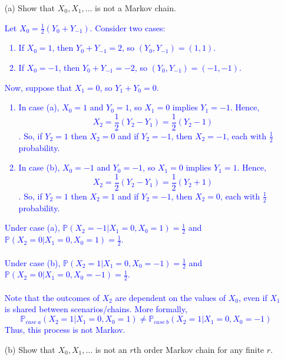 \documentclass{article}
\begin{document}
\begin{enumerate}
    \item[(a)] Show that $X_0, X_1, \ldots$ is not a Markov chain.

        \textcolor{blue}{Let $X_0=\frac{1}{2}(Y_0 + Y_{-1})$. Consider two cases: 
            \begin{enumerate}
                \item If $X_0=1$, then $Y_0 + Y_{-1} = 2$, so $(Y_0,Y_{-1})=(1,1)$.
                \item If $X_0=-1$, then $Y_0 + Y_{-1} = -2$, so $(Y_0,Y_{-1})=(-1,-1)$.
            \end{enumerate}
        Now, suppose that $X_1=0$, so $Y_1 + Y_0 = 0$.
            \begin{enumerate}
                \item In case (a), $X_0=1$ and $Y_0=1$, so $X_1=0$ implies $Y_1=-1$. Hence, $$X_2 = \frac{1}{2}(Y_2-Y_1) = \frac{1}{2}(Y_2 - 1)$$. So, if $Y_2=1$ then $X_2=0$ and if $Y_2=-1$, then $X_2=-1$, each with $\frac{1}{2}$ probability.
                \item In case (b), $X_0=-1$ and $Y_0=-1$, so $X_1=0$ implies $Y_1=1$. Hence, $$X_2 = \frac{1}{2}(Y_2-Y_1) = \frac{1}{2}(Y_2 + 1)$$. So, if $Y_2=1$ then $X_2=1$ and if $Y_2=-1$, then $X_2=0$, each with $\frac{1}{2}$ probability.
            \end{enumerate}
            Under case (a), $\mathbb{P}(X_2=-1 | X_1 = 0, X_0 = 1) = \frac{1}{2}$ and $\mathbb{P}(X_2=0 | X_1 = 0, X_0 = 1) = \frac{1}{2}$. \\ \\ 
            Under case (b), $\mathbb{P}(X_2=1 | X_1 = 0, X_0 = -1) = \frac{1}{2}$ and $\mathbb{P}(X_2=0 | X_1 = 0, X_0 = -1) = \frac{1}{2}$. \\ \\ 
            Note that the outcomes of $X_2$ are dependent on the values of $X_0$, even if $X_1$ is shared between scenarios/chains. More formally, $$\mathbb{P}_{case \ a}(X_2=1 | X_1=0, X_0=1) \neq \mathbb{P}_{case \ b}(X_2=1 | X_1 = 0, X_0 = -1)$$ Thus, this process is not Markov.
        }


    \item[(b)] Show that $X_0, X_1, \ldots$ is not an $r$th order Markov chain for any finite $r$.

        \textcolor{blue}{}
\end{enumerate}
\end{document}
